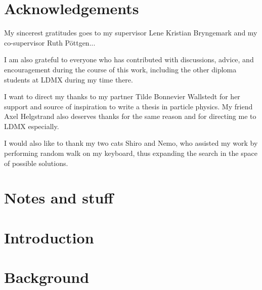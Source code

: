 \clearpage
\thispagestyle{empty}
\section*{Acknowledgements}

My sincerest gratitudes goes to my supervisor Lene Kristian Bryngemark and my co-supervisor Ruth Pöttgen...

I am also grateful to everyone who has contributed with discussions, advice, and encouragement during the course of this work, including the other diploma students at LDMX during my time there. 

I want to direct my thanks to my partner Tilde Bonnevier Wallstedt for her support and source of inspiration to write a thesis in particle physics. My friend Axel Helgstrand also deserves thanks for the same reason and for directing me to LDMX especially. 

I would also like to thank my two cats Shiro and Nemo, who assisted my work by performing random walk on my keyboard, thus expanding the search in the space of possible solutions.

\clearpage
\tableofcontents

\clearpage
{} %
\section*{Notes and stuff}


\newpage
\section{Introduction}


\newpage
\section{Background}


%

